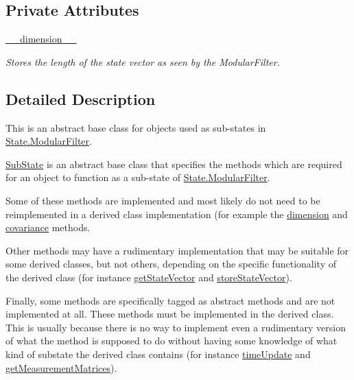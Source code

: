 \subsection*{Private Attributes}
\begin{DoxyCompactItemize}
\item 
\hyperlink{classSubStates_1_1SubState_aea750997b2a75daee4a3147eac68e4f8}{\+\_\+\+\_\+dimension\+\_\+\+\_\+}
\begin{DoxyCompactList}\small\item\em Stores the length of the state vector as seen by the Modular\+Filter. \end{DoxyCompactList}\end{DoxyCompactItemize}


\subsection{Detailed Description}
This is an abstract base class for objects used as sub-\/states in \hyperlink{classState_1_1ModularFilter}{State.\+Modular\+Filter}. 

\hyperlink{classSubStates_1_1SubState}{Sub\+State} is an abstract base class that specifies the methods which are required for an object to function as a sub-\/state of \hyperlink{classState_1_1ModularFilter}{State.\+Modular\+Filter}.

Some of these methods are implemented and most likely do not need to be reimplemented in a derived class implementation (for example the \hyperlink{classSubStates_1_1SubState_a4aebea19a134cb871a7c0b6c2709546a}{dimension} and \hyperlink{classSubStates_1_1SubState_a4d863939fdb98b2739e1e737ec7496ae}{covariance} methods.

Other methods may have a rudimentary implementation that may be suitable for some derived classes, but not others, depending on the specific functionality of the derived class (for instance \hyperlink{classSubStates_1_1SubState_a3ebd1a120f63ed477ee76999518a8828}{get\+State\+Vector} and \hyperlink{classSubStates_1_1SubState_a65edbf44c6d93049cf0b2cb8e4b18b99}{store\+State\+Vector}).

Finally, some methods are specifically tagged as abstract methods and are not implemented at all. These methods must be implemented in the derived class. This is usually because there is no way to implement even a rudimentary version of what the method is supposed to do without having some knowledge of what kind of substate the derived class contains (for instance \hyperlink{classSubStates_1_1SubState_af07ac4d1435fdecff97cff84bae4eeab}{time\+Update} and \hyperlink{classSubStates_1_1SubState_a9dcc51af847b7b946089dd73c387ca19}{get\+Measurement\+Matrices}).

